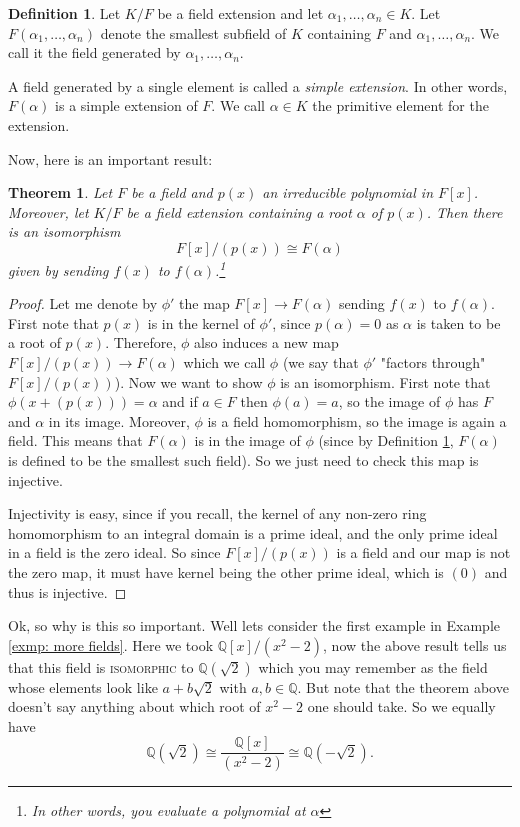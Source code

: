 \documentclass[11pt,a4paper]{report}
\theoremstyle{plain}
\newtheorem{theorem}[subsection]{Theorem}
\theoremstyle{definition}
\newtheorem{definition}[subsection]{Definition}
\theoremstyle{definition}
\def\QQ{\mathbb{Q}}
\def \a{\alpha}
\begin{document}
	\begin{definition}\label{definition: simple field ext}
		Let $K/F$ be a field extension and let $\a_1,\dots,\a_n \in K$. Let $F(\a_1,\dots,\a_n)$ denote the smallest subfield of $K$ containing $F$ and $\a_1,\dots,\a_n$. We call it the field generated by $\a_1,\dots,\a_n$.
		
		A field generated by a single element is called a \textit{simple extension}. In other words, $F(\a)$ is a simple extension of $F$. We call $\a \in K$ the primitive element for the extension.
	\end{definition}
	
	Now, here is an important result:
	
	\begin{theorem}\label{thm: field iso}
		Let $F$ be a field and $p(x)$ an irreducible polynomial in $F[x]$. Moreover, let $K/F$ be a field extension containing a root  $\a$ of $p(x)$. Then there is an isomorphism \[F[x]/(p(x)) \cong F(\a) \] given by sending $f(x)$ to $f(\a)$.\footnote{In other words, you evaluate a polynomial at $\a$}
	\end{theorem}
	\begin{proof}
		Let me denote by $\phi'$ the map $F[x] \to F(\a)$ sending $f(x)$ to $f(\a)$. First note that $p(x)$ is in the kernel of $\phi'$, since $p(\a)=0$ as $\a$ is taken to be a root of $p(x)$. Therefore, $\phi$ also induces a new map $F[x]/(p(x)) \to F(\a)$ which we  call $\phi$ (we say that $\phi'$ "factors through" $F[x]/(p(x))$). Now we want to show $\phi$ is an isomorphism. First note that  $\phi(x+(p(x)))=\a$ and if $a \in F$ then $\phi(a)=a$, so the image of $\phi$ has $F$ and $\a$ in its image. Moreover, $\phi$ is a field homomorphism, so the image is again a field. This means that $F(\a)$ is in the image of $\phi$ (since by Definition \ref{definition: simple field ext}, $F(\a)$ is defined to be the smallest such field). So we just need to check this map is injective. 
		
		Injectivity is easy, since if you recall, the kernel of any non-zero ring homomorphism to an integral domain is a prime ideal, and the only prime ideal in a field is the zero ideal. So since $F[x]/(p(x))$ is a field and our map is not the zero map, it must have kernel being the other prime ideal, which is $(0)$ and thus is injective.
	\end{proof}
	
	Ok, so why is this so important. Well lets consider the first example in Example \ref{exmp: more fields}. Here we took $\QQ[x]/(x^2-2)$, now the above result tells us that this field is \textsc{isomorphic} to $\QQ(\sqrt{2})$ which you may remember as the field whose elements look like $a+b\sqrt{2}$ with $a,b \in \QQ$. But note that the theorem above doesn't say anything about which root of $x^2-2$ one should take. So we equally have \[\QQ(\sqrt{2}) \cong \frac{\QQ[x]}{(x^2-2)} \cong \QQ(-\sqrt{2}).\]
	
\end{document}

